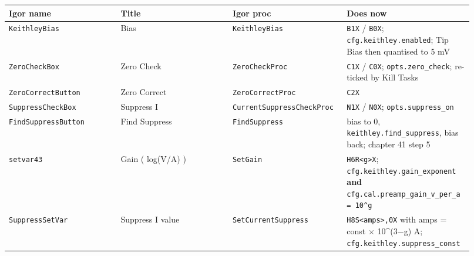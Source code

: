 \small\setlength{\LTleft}{0pt}\setlength{\LTright}{\fill}
\begin{longtable}{@{}>{\raggedright\arraybackslash}p{0.230\linewidth}>{\raggedright\arraybackslash}p{0.230\linewidth}>{\raggedright\arraybackslash}p{0.230\linewidth}>{\raggedright\arraybackslash}p{0.230\linewidth}@{}}
\toprule
\textbf{Igor name} & \textbf{Title} & \textbf{Igor proc} & \textbf{Does now} \\
\midrule\endhead
\texttt{Keithley\discretionary{}{}{}Bias} & Bias & \texttt{Keithley\discretionary{}{}{}Bias} & \texttt{B1X} / \texttt{B0X}; \texttt{cfg.\discretionary{}{}{}keithley.\discretionary{}{}{}enabled}; Tip Bias then quantised to 5 mV \\
\texttt{Zero\discretionary{}{}{}Check\discretionary{}{}{}Box} & Zero Check & \texttt{Zero\discretionary{}{}{}Check\discretionary{}{}{}Proc} & \texttt{C1X} / \texttt{C0X}; \texttt{opts.\discretionary{}{}{}zero\_\discretionary{}{}{}check}; re-ticked by Kill Tasks \\
\texttt{Zero\discretionary{}{}{}Correct\discretionary{}{}{}Button} & Zero Correct & \texttt{Zero\discretionary{}{}{}Correct\discretionary{}{}{}Proc} & \texttt{C2X} \\
\texttt{Suppress\discretionary{}{}{}Check\discretionary{}{}{}Box} & Suppress I & \texttt{Current\discretionary{}{}{}Suppress\discretionary{}{}{}Check\discretionary{}{}{}Proc} & \texttt{N1X} / \texttt{N0X}; \texttt{opts.\discretionary{}{}{}suppress\_\discretionary{}{}{}on} \\
\texttt{Find\discretionary{}{}{}Suppress\discretionary{}{}{}Button} & Find Suppress & \texttt{Find\discretionary{}{}{}Suppress} & bias to 0, \texttt{keithley.\discretionary{}{}{}find\_\discretionary{}{}{}suppress}, bias back; chapter 41 step 5 \\
\texttt{setvar43} & Gain ( log(V/A) ) & \texttt{Set\discretionary{}{}{}Gain} & \texttt{H6R<g>X}; \texttt{cfg.\discretionary{}{}{}keithley.\discretionary{}{}{}gain\_\discretionary{}{}{}exponent} \textbf{and} \texttt{cfg.\discretionary{}{}{}cal.\discretionary{}{}{}preamp\_\discretionary{}{}{}gain\_\discretionary{}{}{}v\_\discretionary{}{}{}per\_\discretionary{}{}{}a = 10\textasciicircum{}g} \\
\texttt{Suppress\discretionary{}{}{}Set\discretionary{}{}{}Var} & Suppress I value & \texttt{Set\discretionary{}{}{}Current\discretionary{}{}{}Suppress} & \texttt{H8S<amps>,\discretionary{}{}{}0X} with amps = const $\times$ 10\textasciicircum{}(3−g) \textmu{}A; \texttt{cfg.\discretionary{}{}{}keithley.\discretionary{}{}{}suppress\_\discretionary{}{}{}const} \\
\bottomrule
\end{longtable}
\normalsize

